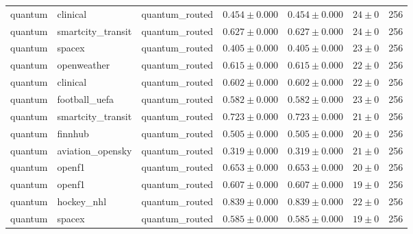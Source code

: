 \begin{table}[htbp]
\begin{tabular}{l l l r r r r}
quantum & clinical & quantum\_routed & $0.454\pm0.000$ & $0.454\pm0.000$ & $24\pm0$ & 256 \\
quantum & smartcity\_transit & quantum\_routed & $0.627\pm0.000$ & $0.627\pm0.000$ & $24\pm0$ & 256 \\
quantum & spacex & quantum\_routed & $0.405\pm0.000$ & $0.405\pm0.000$ & $23\pm0$ & 256 \\
quantum & openweather & quantum\_routed & $0.615\pm0.000$ & $0.615\pm0.000$ & $22\pm0$ & 256 \\
quantum & clinical & quantum\_routed & $0.602\pm0.000$ & $0.602\pm0.000$ & $22\pm0$ & 256 \\
quantum & football\_uefa & quantum\_routed & $0.582\pm0.000$ & $0.582\pm0.000$ & $23\pm0$ & 256 \\
quantum & smartcity\_transit & quantum\_routed & $0.723\pm0.000$ & $0.723\pm0.000$ & $21\pm0$ & 256 \\
quantum & finnhub & quantum\_routed & $0.505\pm0.000$ & $0.505\pm0.000$ & $20\pm0$ & 256 \\
quantum & aviation\_opensky & quantum\_routed & $0.319\pm0.000$ & $0.319\pm0.000$ & $21\pm0$ & 256 \\
quantum & openf1 & quantum\_routed & $0.653\pm0.000$ & $0.653\pm0.000$ & $20\pm0$ & 256 \\
quantum & openf1 & quantum\_routed & $0.607\pm0.000$ & $0.607\pm0.000$ & $19\pm0$ & 256 \\
quantum & hockey\_nhl & quantum\_routed & $0.839\pm0.000$ & $0.839\pm0.000$ & $22\pm0$ & 256 \\
quantum & spacex & quantum\_routed & $0.585\pm0.000$ & $0.585\pm0.000$ & $19\pm0$ & 256 \\
\hline
\end{tabular}
\end{table}
